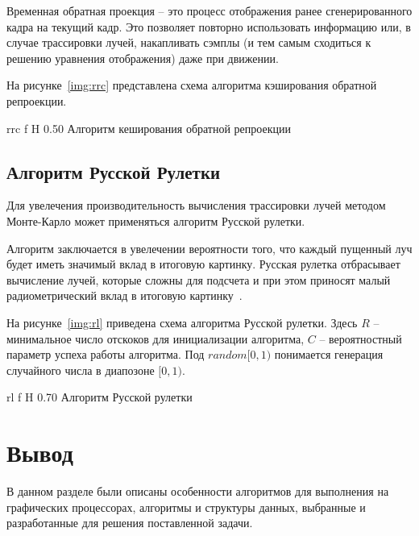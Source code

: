 Временная обратная проекция -- это процесс отображения ранее сгенерированного кадра на 
текущий кадр. Это позволяет повторно использовать информацию или, в случае трассировки 
лучей, накапливать сэмплы (и тем самым сходиться к решению уравнения отображения) даже при движении.

На рисунке~\ref{img:rrc} представлена схема алгоритма кэширования обратной
репроекции.

    {rrc}
    {f}
    {H}
    {0.50\textwidth}
    {Алгоритм кеширования обратной репроекции}

\subsection{Алгоритм Русской Рулетки}

Для увелечения производительность вычисления трассировки лучей методом 
Монте-Карло может применяться алгоритм Русской рулетки.

Алгоритм заключается в увелечении вероятности того, что каждый пущенный луч
будет иметь значимый вклад в итоговую картинку. Русская рулетка отбрасывает
вычисление лучей, которые сложны для подсчета и при этом приносят малый 
радиометрический вклад в итоговую картинку~\cite{PBRT3e}.

На рисунке~\ref{img:rl} приведена схема алгоритма Русской рулетки.
Здесь $R$ -- минимальное число отскоков для инициализации алгоритма, 
$C$ -- вероятностный параметр успеха работы алгоритма. Под $random[0,1)$ понимается
генерация случайного числа в диапозоне $[0,1)$.

    {rl}
    {f}
    {H}
    {0.70\textwidth}
    {Алгоритм Русской рулетки}

\section*{Вывод}

В данном разделе были описаны особенности алгоритмов для выполнения
на графических процессорах, алгоритмы и структуры данных, выбранные 
и разработанные для решения поставленной задачи. 
